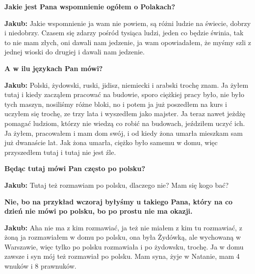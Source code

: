 \textbf{Jakie jest Pana wspomnienie ogółem o Polakach?} 

\textbf{Jakub:} Jakie wspomnienie ja wam nie powiem, są różni ludzie na świecie, dobrzy i niedobrzy. Czasem się zdarzy pośród tysiąca ludzi, jeden co będzie świnia, tak to nie mam złych, oni dawali nam jedzenie, ja wam opowiadałem, że myśmy szli z jednej wioski do drugiej i dawali nam jedzenie. 

\textbf{A w ilu językach Pan mówi?} 

\textbf{Jakub:} Polski, żydowski, ruski, jidisz, niemiecki i arabski trochę znam. Ja żyłem tutaj i kiedy zacząłem pracować na budowie, sporo ciężkiej pracy było, nie było tych maszyn, nosiliśmy różne bloki, no  i potem ja już poszedłem na kurs i uczyłem się trochę, ze trzy lata i wyszedłem jako majster. Ja teraz nawet jeżdżę pomagać ludziom, którzy nie wiedzą co robić na budowach, jeździłem uczyć ich. Ja żyłem, pracowałem i mam dom swój, i od kiedy żona umarła mieszkam sam już dwanaście lat. Jak żona umarła, ciężko było samemu w domu, więc przyszedłem tutaj i tutaj nie jest źle.  

\textbf{Będąc tutaj mówi Pan często po polsku?} 

\textbf{Jakub:} Tutaj też rozmawiam po polsku, dlaczego nie? Mam się kogo bać? 

\textbf{Nie, bo na przykład wczoraj byłyśmy u takiego Pana, który na co dzień nie mówi po polsku, bo po prostu nie ma okazji.}

\textbf{Jakub:} Aha nie ma z kim rozmawiać, ja też nie miałem z kim tu rozmawiać, z żoną ja rozmawiałem w domu po polsku, ona była Żydówką, ale wychowaną  w Warszawie, więc tylko po polsku rozmawiała i po żydowsku, trochę. Ja w domu zawsze i syn mój też rozmawiał po polsku. Mam syna, żyje w Natanie, mam 4 wnuków i 8 prawnuków.  